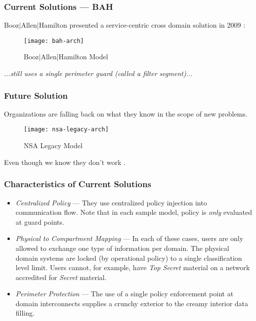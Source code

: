 \begin{frame}[t]
\frametitle{Current Solutions --- BAH}
{Booz$\mid$Allen$\mid$Hamilton} presented a service-centric cross domain solution in 2009 \cite{proposal:bah-arch}:
\begin{figure}[!t]
\centering
\texttt{[image: bah-arch]}
\caption{Booz|Allen|Hamilton Model}
\label{fig:model:conceptual-model-bah}
\end{figure}
\textit{...still uses a single perimeter guard (called a filter segment)...}
\end{frame}

\begin{frame}[t]
\frametitle{Future Solution}
Organizations are falling back on what they know in the scope of new problems.
\begin{figure}[!t]
\centering
\texttt{[image: nsa-legacy-arch]}
\caption{NSA Legacy Model}
\label{fig:model:conceptual-model-nsa-legacy-II}
\end{figure}
Even though we know they don't work \cite{proposal:ron-ross}.
\end{frame}

%
\begin{frame}
\frametitle{Characteristics of Current Solutions}
\begin{itemize}
\item<2-> \textit{Centralized Policy} --- They use centralized policy injection into communication flow.  Note that in each sample model, policy is \textit{only} evaluated at guard points.
\item<3-> \textit{Physical to Compartment Mapping} --- In each of these cases, users are only allowed to exchange one type of information per domain.  The physical domain systems are locked (by operational policy) to a single classification level limit.  Users cannot, for example, have \emph{Top Secret} material on a network accredited for \emph{Secret} material.
\item<4-> \textit{Perimeter Protection} --- The use of a single policy enforcement point at domain interconnects supplies a crunchy exterior to the creamy interior data filling.
\end{itemize}
\end{frame}

